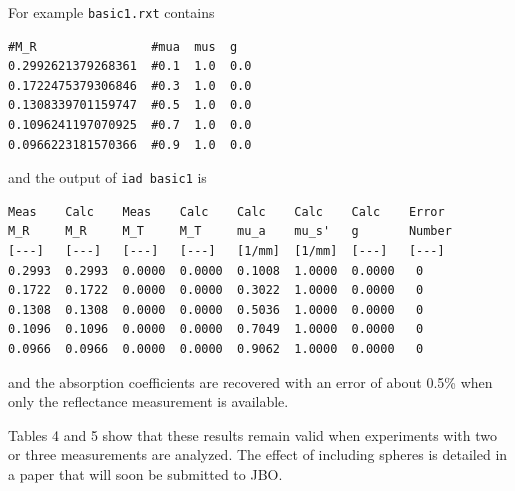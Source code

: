 \documentclass{article}
\begin{document}
For example \texttt{basic1.rxt} contains
\begin{verbatim}
#M_R                #mua  mus  g
0.2992621379268361  #0.1  1.0  0.0
0.1722475379306846  #0.3  1.0  0.0
0.1308339701159747  #0.5  1.0  0.0
0.1096241197070925  #0.7  1.0  0.0
0.0966223181570366  #0.9  1.0  0.0
\end{verbatim}
and the output of \texttt{iad basic1} is
\begin{verbatim}
Meas    Calc    Meas    Calc    Calc    Calc    Calc    Error
M_R     M_R     M_T     M_T     mu_a    mu_s'   g       Number
[---]   [---]   [---]   [---]   [1/mm]  [1/mm]  [---]   [---]
0.2993  0.2993  0.0000  0.0000  0.1008  1.0000  0.0000   0
0.1722  0.1722  0.0000  0.0000  0.3022  1.0000  0.0000   0
0.1308  0.1308  0.0000  0.0000  0.5036  1.0000  0.0000   0
0.1096  0.1096  0.0000  0.0000  0.7049  1.0000  0.0000   0
0.0966  0.0966  0.0000  0.0000  0.9062  1.0000  0.0000   0
\end{verbatim}
and the absorption coefficients are recovered with an error of about
0.5\% when only the reflectance measurement is available.

Tables 4 and 5 show that these results remain valid when experiments
with two or three measurements are analyzed.  The effect of including
spheres is detailed in a paper that will soon be submitted to JBO.
\end{document}
